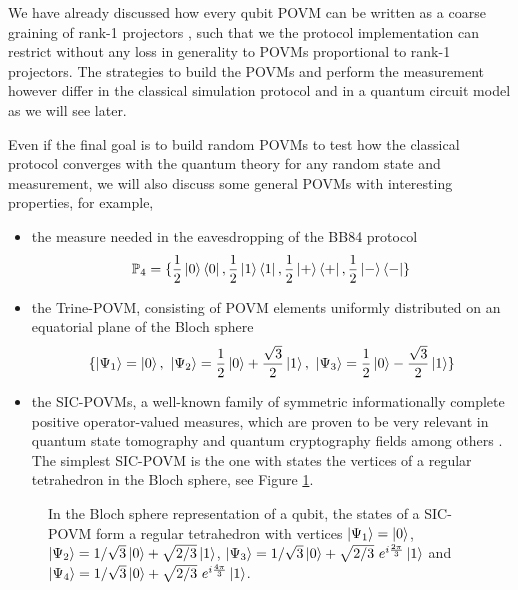 We have already discussed how every qubit POVM can be written as a coarse graining of rank-1 projectors \cite{barrett2002}, such that we the protocol implementation can restrict without any loss in generality to POVMs proportional to rank-1 projectors. The strategies to build the POVMs and perform the measurement however differ in the classical simulation protocol and in a quantum circuit model as we will see later.

Even if the final goal is to build random POVMs to test how the classical protocol converges with the quantum theory for any random state and measurement, we will also discuss some general POVMs with interesting properties, for example, 
\begin{itemize}
    \item the measure needed in the eavesdropping  of the BB84 protocol \cite{nielsen2000}
\begin{equation}
    \mathbb{P}_4 = \{\frac{1}{2}\ket{0}\bra{0}, \frac{1}{2}\ket{1}\bra{1}, \frac{1}{2}\ket{+}\bra{+}, \frac{1}{2}\ket{-}\bra{-} \}
\end{equation}
    \item the Trine-POVM, consisting of POVM elements uniformly distributed on an equatorial plane of the Bloch sphere
\begin{equation}
\{\ket{\Psi_1}=\ket{0},\ \ket{\Psi_2}=\frac{1}{2}\ket{0} + \frac{\sqrt{3}}{2} \ket{1},\ \ket{\Psi_3}=\frac{1}{2}\ket{0} - \frac{\sqrt{3}}{2} \ket{1}\}
\end{equation}
    \item the SIC-POVMs, a well-known family of symmetric informationally complete positive operator-valued measures, which are proven to be very relevant in quantum state tomography and quantum cryptography fields among others \cite{renes2004}. The simplest SIC-POVM is the one with states the vertices of a regular tetrahedron in the Bloch sphere, see Figure \ref{fig:sic_povm}.
\end{itemize}


\begin{figure}[!ht]
\begin{center}
\centerline{}
\caption[SIC-POVM as tetrahedron in Bloch sphere]%
{\label{fig:sic_povm}%
In the Bloch sphere representation of a qubit, the states of a SIC-POVM form a regular tetrahedron with vertices $\ket{\Psi_1}=\ket{0}$, $\ket{\Psi_2}=1/{\sqrt{3}}\ket{0} + \sqrt{2/3} \ket{1}$, $\ket{\Psi_3}=1/{\sqrt{3}}\ket{0} + \sqrt{2/3} \ e^{i\frac{2\pi}{3}} \ket{1}$ and $\ket{\Psi_4}=1/{\sqrt{3}}\ket{0} + \sqrt{2/3}\ e^{i\frac{4\pi}{3}} \ket{1}$.}
\end{center}
\end{figure}

